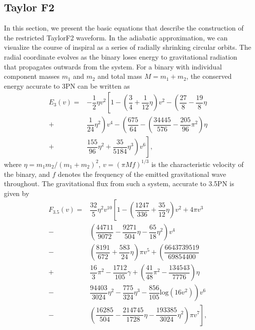 \documentclass[aps,
prd,
amsmath,
amssymb,
twocolumn,
floatfix,
groupedaddress]{revtex4-1}
\def\l({\left(}
\def\r){\right)}
\begin{document}
\subsection{Taylor F2}\label{sec:level2:TaylorF2}
In this section, we present the basic equations that describe the construction of the restricted TaylorF2 waveform. In the adiabatic approximation, we can visualize the course of inspiral as a series of radially shrinking circular orbits. 
The radial coordinate evolves as the binary loses energy to gravitational radiation that propagates outwards from the system.
For a binary with individual component masses $m_1$ and $m_2$ and total mass $M=m_1+m_2$, the conserved energy accurate to 3PN
can be written as \citep{Jaranowski:1997ky,Jaranowski:1999ye,Jaranowski:1999qd,Damour:2001bu,Blanchet:2003gy,Damour:2000ni,Blanchet:2002mb}
\begin{equation}
\begin{split}\label{eq:E3PN}
E_3(v)=&-\dfrac{1}{2}\eta v^2 \left[1- \l(\dfrac{3}{4}+\dfrac{1}{12}\eta\r)v^2 - \l(\dfrac{27}{8}-\dfrac{19}{8}\eta\right.\right.\\
+&\left.\left.\dfrac{1}{24}\eta^2 \r)v^4 - \l(\dfrac{675}{64}-\l(\dfrac{34445}{576}-\dfrac{205}{96}\pi^2\r)\eta\right.\right.\\
+&\left.\left.\dfrac{155}{96}\eta^2 +\dfrac{35}{5184}\eta^3\r) v^6\right],
\end{split}
\end{equation}
where $\eta=m_1m_2/(m_1+m_2)^2$, $v=(\pi Mf)^{1/3}$ is the characteristic velocity of the binary, and $f$ denotes the frequency of the emitted gravitational wave throughout.
The gravitational flux from such a system, accurate to 3.5PN is given by \citep{FluxandE3-5PN,Blanchet:2004ek,Blanchet:2005tk,Blanchet:2004bb}
\begin{equation}
\begin{split}\label{eq:Ft3.5PN}
F_{3.5}(v)=&\dfrac{32}{5}\eta^2 v^{10}\left[1 - \l(\dfrac{1247}{336}+\dfrac{35}{12}\eta\r)v^2+4\pi v^3\right.\\
-&\left.\l(\dfrac{44711}{9072}-\dfrac{9271}{504}\eta -\dfrac{65}{18}\eta^2 \r)v^4\right.\\
-&\left.\l(\dfrac{8191}{672}+\dfrac{583}{24}\eta\r)\pi v^5+ \l(\dfrac{6643739519}{69854400}\right.\right.\\
+&\left.\left.\dfrac{16}{3}\pi^2 -\dfrac{1712}{105}\gamma +\l(\dfrac{41}{48}\pi^2 -\dfrac{134543}{7776}\r)\eta \right.\right.\\
-&\left.\left.\dfrac{94403}{3024}\eta^2 -\dfrac{775}{324}\eta^3 -\dfrac{856}{105}\textrm{log}(16v^2)\r)v^6\right.\\ 
-&\left.\l(\dfrac{16285}{504}-\dfrac{214745}{1728}\eta -\dfrac{193385}{3024}\eta^2 \r)\pi v^7\right],
\end{split}
\end{equation}
\end{document}
